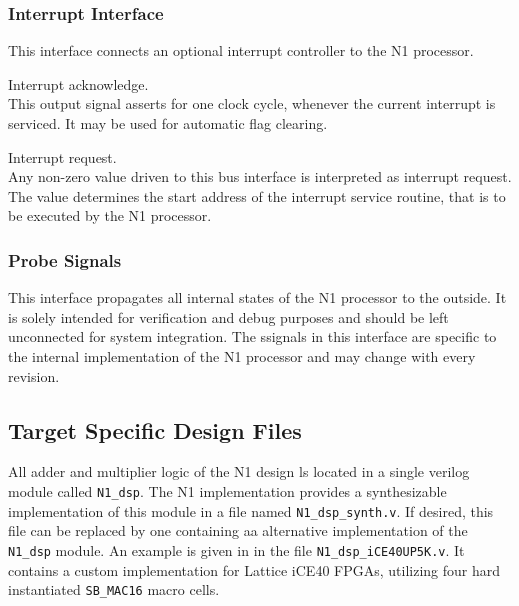 \subsubsection{Interrupt Interface}
\label{integration:if:irq}
This interface connects an optional interrupt controller to the N1 processor. 


\begin{description}[style=nextline]

\item[\texttt{irq\_ack\_o}] Interrupt acknowledge. \\
  This output signal asserts for one clock cycle, whenever the current interrupt is serviced.
  It may be used for automatic flag clearing.

\item[\texttt{irq\_req\_i}] Interrupt request. \\
  Any non-zero value driven to this bus interface is interpreted as interrupt request.
  The value determines the start address of the interrupt service routine, that is to be executed by the
  N1 processor.
  
\end{description}

\subsubsection{Probe Signals}
\label{integration:if:prb}
This interface propagates all internal states of the N1 processor to the outside.
It is solely intended for verification and debug purposes and should be left unconnected for system integration.
The ssignals in this interface are specific to the internal implementation of the N1 processor and may change
with every revision.

\subsection{Target Specific Design Files}
\label{integration:ifs}
All adder and multiplier logic of the N1 design ls located in a single \gls{verilog} module called \texttt{N1\_dsp}.
The N1 implementation provides a synthesizable implementation of this module in a file named
\texttt{N1\_dsp\_synth.v}.
If desired, this file can be replaced by one containing aa alternative implementation of the \texttt{N1\_dsp} module.
An example is given in in the file \texttt{N1\_dsp\_iCE40UP5K.v}.
It contains a custom implementation for Lattice iCE40 FPGAs, utilizing four hard instantiated \texttt{SB\_MAC16}
macro cells.

